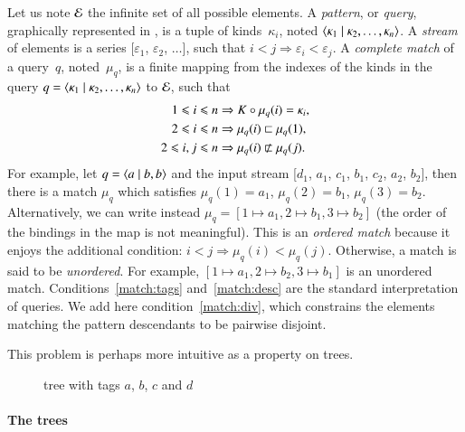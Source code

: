 Let us note \(\cal E\) the infinite set of all possible \XML elements.
A \emph{pattern}, or \emph{query}, graphically represented in
, is a tuple of kinds~\(\kappa_i\), noted
\(\langle \kappa_1 \mid \kappa_2, \dots, \kappa_n\rangle\). A \emph{stream} of
\XML elements is a series [\(\varepsilon_1\), \(\varepsilon_2\),
  \(\dots\)], such that \(i < j \Rightarrow \varepsilon_i <
\varepsilon_j\). A \emph{complete match} of a query~\(q\),
noted~\(\mu_q\), is a finite mapping from the indexes of the kinds in
the query \(q = \langle \kappa_1 \mid \kappa_2, \dots, \kappa_n\rangle\) to
\(\cal E\), such that
\begin{align}
1 \leqslant i \leqslant n & \Rightarrow K \circ \mu_q(i) = \kappa_i,\label{match:tags}\\
2 \leqslant i \leqslant n & \Rightarrow \mu_q(i) \sqsubset \mu_q(1),\label{match:desc}\\
2 \leqslant i,j \leqslant n & \Rightarrow \mu_q(i) \nsqsubset \mu_q(j).\label{match:div}
\end{align}
For example, let \(q = \langle a \mid b,b\rangle\) and the input stream [\(d_1\),
  \(a_1\), \(c_1\), \(b_1\), \(c_2\), \(a_2\), \(b_2\)], then there is
a match \(\mu_q\) which satisfies \(\mu_q(1) = a_1\), \(\mu_q(2) =
b_1\), \(\mu_q(3) = b_2\). Alternatively, we can write instead \(\mu_q
= [1 \mapsto a_1, 2 \mapsto b_1, 3 \mapsto b_2]\) (the order of the
bindings in the map is not meaningful). This is an \emph{ordered
  match} because it enjoys the additional condition: \(i < j
\Rightarrow \mu_q(i) < \mu_q(j)\). Otherwise, a match is said to be
\emph{unordered}. For example, \([1 \mapsto a_1, 2 \mapsto b_2, 3
  \mapsto b_1]\) is an unordered match. Conditions~\eqref{match:tags}
and~\eqref{match:desc} are the standard interpretation of \XPath
queries. We add here condition~\eqref{match:div}, which constrains the
elements matching the pattern descendants to be pairwise disjoint.

This problem is perhaps more intuitive as a property on \XML trees.

\begin{wrapfigure}[11]{r}{0pt}
\centering
{}
\caption{\XML tree with tags \(a\), \(b\), \(c\) and \(d\)}
\label{fig:xml_tree}
\end{wrapfigure}

\paragraph{The \XML trees}

